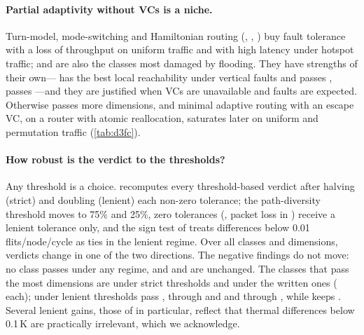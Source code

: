 \paragraph{Partial adaptivity without VCs is a niche.} Turn-model, mode-switching and Hamiltonian routing (, , ) buy fault tolerance with a loss of throughput on uniform traffic and with high latency under hotspot traffic;  and  are also the classes most damaged by flooding. They have strengths of their own--- has the best local reachability under vertical faults and passes ,  passes ---and they are justified when VCs are unavailable and faults are expected. Otherwise  passes more dimensions, and minimal adaptive routing with an escape VC, on a router with atomic reallocation, saturates later on uniform and permutation traffic (\cref{tab:d3fc}).

\paragraph{How robust is the verdict to the thresholds?} Any threshold is a choice.  recomputes every threshold-based verdict after halving (strict) and doubling (lenient) each non-zero tolerance; the path-diversity threshold moves to 75\% and 25\%, zero tolerances (, packet loss in ) receive a lenient tolerance only, and the sign test of  treats differences below 0.01 flits/node/cycle as ties in the lenient regime. Over all classes and dimensions,  verdicts change in one of the two directions. The negative findings do not move: no class passes  under any regime, and  and  are unchanged. The classes that pass the most dimensions are  under strict thresholds and  under the written ones ( each); under lenient thresholds  pass ,  through  and  and  through , while  keeps . Several lenient gains, those of  in particular, reflect that thermal differences below 0.1\,K are practically irrelevant, which we acknowledge.

\begin{table}[tbp]
\centering
\caption{Sensitivity of the verdict to the thresholds. Strict and lenient regimes halve and double every non-zero tolerance (: 75\% and 25\%); zero tolerances receive a lenient value only; $^{a}$the router-load condition of  is also relaxed to $-0.01$; $^{b}$differences below 0.01 flits/node/cycle count as ties.  has no threshold and verdicts marked $^{\ddagger}$ do not depend on thresholds. Passes: number of classes passing (S/R/L). Changes: classes losing (S) or gaining (L) the dimension relative to the registered threshold.}
\label{tab:thresh}
\scriptsize
\setlength{\tabcolsep}{3pt}

\end{table}

